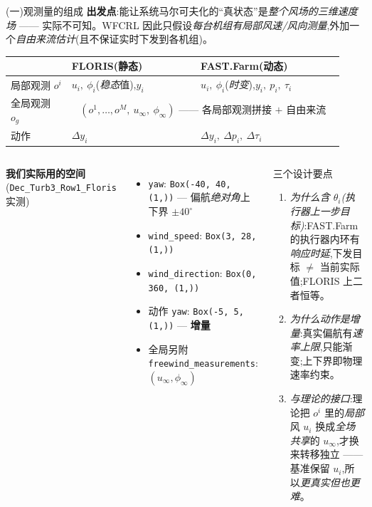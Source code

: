 \documentclass[aspectratio=169,11pt,UTF8]{ctexbeamer}
\newcommand{\wind}{u_{\infty}}
\newcommand{\emphb}[1]{\textcolor{myred}{\textbf{#1}}}
\begin{document}
\begin{frame}{(一)观测量的组成}
\small
\textbf{出发点}:能让系统马尔可夫化的“真状态”是\emph{整个风场的三维速度场} —— 实际不可知。WFCRL 因此只假设\emph{每台机组有局部风速/风向测量},外加一个\emph{自由来流估计}(且不保证实时下发到各机组)。
\begin{center}\footnotesize\renewcommand{\arraystretch}{0.25}
\begin{tabular}{@{}p{0.17\linewidth} p{0.36\linewidth} p{0.40\linewidth}@{}}
\toprule
 & \textbf{FLORIS(静态)} & \textbf{FAST.Farm(动态)} \\
\midrule
局部观测 $o^i$ & $u_i,\ \phi_i$(\emph{稳态}值),$y_i$ & $u_i,\ \phi_i$(\emph{时变}),$y_i,\ p_i,\ \tau_i$ \\
全局观测 $o_g$ & \multicolumn{2}{c}{$(o^1,\dots,o^M,\ \wind,\ \phi_\infty)$ —— 各局部观测拼接 $+$ 自由来流} \\
动作 & $\Delta y_i$ & $\Delta y_i,\ \Delta p_i,\ \Delta \tau_i$ \\
\bottomrule
\end{tabular}
\end{center}
\footnotesize
\begin{columns}[T]
\textbf{我们实际用的空间}(\texttt{Dec\_Turb3\_Row1\_Floris} 实测)
\begin{itemize}\setlength\itemsep{0pt}
  \item \texttt{yaw}: \texttt{Box(-40, 40, (1,))} — 偏航\emph{绝对角}上下界 $\pm40^\circ$
  \item \texttt{wind\_speed}: \texttt{Box(3, 28, (1,))}
  \item \texttt{wind\_direction}: \texttt{Box(0, 360, (1,))}
  \item 动作 \texttt{yaw}: \texttt{Box(-5, 5, (1,))} — \emphb{增量}
  \item 全局另附 \texttt{freewind\_measurements}: $(\wind,\phi_\infty)$
\end{itemize}
\begin{block}{三个设计要点}
\footnotesize
\begin{enumerate}\setlength\itemsep{1pt}
  \item \emph{为什么含 $\theta_i$(执行器上一步目标)}:FAST.Farm 的执行器内环有\emph{响应时延},下发目标 $\neq$ 当前实际值;FLORIS 上二者恒等。
  \item \emph{为什么动作是增量}:真实偏航有\emph{速率上限},只能渐变;上下界即物理速率约束。
  \item \emph{与理论的接口}:理论把 $o^i$ 里的\emph{局部}风 $u_i$ 换成\emph{全场共享}的 $\wind$,才换来转移独立 —— 基准保留 $u_i$,所以\emph{更真实但也更难}。
\end{enumerate}
\end{block}
\end{columns}
\end{frame}
\end{document}
